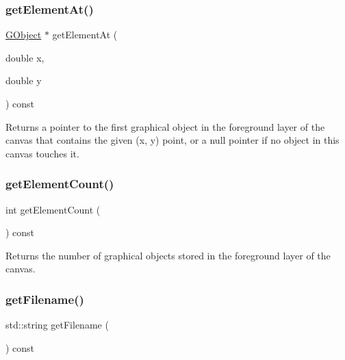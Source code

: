 \subsubsection{\texorpdfstring{get\+Element\+At()}{getElementAt()}}
{\footnotesize\ttfamily \mbox{\hyperlink{classGObject}{G\+Object}} $\ast$ get\+Element\+At (\begin{DoxyParamCaption}\item[{double}]{x,  }\item[{double}]{y }\end{DoxyParamCaption}) const\hspace{0.3cm}{\ttfamily [virtual]}}



Returns a pointer to the first graphical object in the foreground layer of the canvas that contains the given (x, y) point, or a null pointer if no object in this canvas touches it. 

\mbox{\label{classGCanvas_adf7d37ec315f859648def92e6b32408f}} 
\subsubsection{\texorpdfstring{get\+Element\+Count()}{getElementCount()}}
{\footnotesize\ttfamily int get\+Element\+Count (\begin{DoxyParamCaption}{ }\end{DoxyParamCaption}) const\hspace{0.3cm}{\ttfamily [virtual]}}



Returns the number of graphical objects stored in the foreground layer of the canvas. 

\mbox{\label{classGCanvas_a2011812670c3de9747702e3c052b6bb3}} 
\subsubsection{\texorpdfstring{get\+Filename()}{getFilename()}}
{\footnotesize\ttfamily std\+::string get\+Filename (\begin{DoxyParamCaption}{ }\end{DoxyParamCaption}) const\hspace{0.3cm}{\ttfamily [virtual]}}



